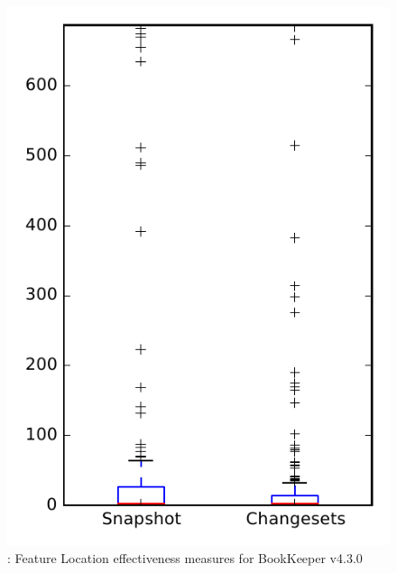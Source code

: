 
\begin{figure}
\centering
\includegraphics[height=0.4\textheight]{figures/flt/rq1_bookkeeper}
\caption{\fone: Feature Location effectiveness measures for BookKeeper v4.3.0}
\label{fig:flt:rq1:bookkeeper}
\end{figure}
